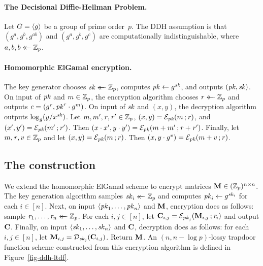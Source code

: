 \paragraph{The Decisional Diffie-Hellman Problem.}
Let $G = \langle g \rangle$ be a group of prime order~$p$. The DDH assumption is
that $(g^a, g^b, g^{ab})$ and $(g^a, g^b, g^c)$ are computationally
indistinguishable, where $a,b,b \mathrel{\leftarrow\mkern-14mu\leftarrow} \mathbb{Z}_p$.

\paragraph{Homomorphic ElGamal encryption.}
The key generator chooses $\mathit{sk} \mathrel{\leftarrow\mkern-14mu\leftarrow} \mathbb{Z}_p$, computes $\mathit{pk} \gets g^{\mathit{sk}}$, and
outputs $(\mathit{pk},\mathit{sk})$.
%
On input of $\mathit{pk}$ and $m \in \mathbb{Z}_p$, the encryption algorithm chooses $\mathit{r}
\mathrel{\leftarrow\mkern-14mu\leftarrow} \mathbb{Z}_p$ and outputs $\mathit{c} = (g^{\mathit{r}}, \mathit{pk}^{\mathit{r}} \cdot g^m)$.
%
On input of $\mathit{sk}$ and $(x, y)$, the decryption algorithm outputs
$\log_g(y/x^{\mathit{sk}})$.
%
Let $m, m^\prime, \mathit{r}, \mathit{r}^\prime \in \mathbb{Z}_p$,
$(x,y) = \mathcal{E}_{\mathit{pk}}(m \,;\mathit{r})$, and $(x^\prime,y^\prime) =
\mathcal{E}_{\mathit{pk}}(m^\prime \,;\mathit{r}^\prime)$. Then $(x\cdot x^\prime, y \cdot
y^\prime) = \mathcal{E}_{\mathit{pk}}(m + m^\prime \,; \mathit{r}+\mathit{r}^\prime)$.
%
Finally, let $m, \mathit{r}, v \in \mathbb{Z}_p$ and let $(x,y) = \mathcal{E}_{\mathit{pk}}(m \,;
\mathit{r})$. Then $(x, y\cdot g^v) = \mathcal{E}_{\mathit{pk}}(m + v \,;\mathit{r})$.

\subsection{The construction}
We extend the homomorphic ElGamal scheme to encrypt matrices $\mathbf{M} \in
(\mathbb{Z}_p)^{n\times n}$.
%
The key generation algorithm samples $\mathit{sk}_i \mathrel{\leftarrow\mkern-14mu\leftarrow} \mathbb{Z}_p$ and computes $\mathit{pk}_i
\gets g^{\mathit{sk}_i}$ for each $i \in [n]$.
%
Next, on input $\langle \mathit{pk}_1, \ldots, \mathit{pk}_n \rangle$ and $\mathbf{M}$, encryption does as
follows: sample $\mathit{r}_1, \ldots, \mathit{r}_n \mathrel{\leftarrow\mkern-14mu\leftarrow} \mathbb{Z}_p$. For each $i,j \in
[n]$, let $\mathbf{C}_{i,j} = \mathcal{E}_{\mathit{pk}_j}(\mathbf{M}_{i,j} \,; \mathit{r}_i)$ and output
$\mathbf{C}$.
%
Finally, on input $\langle \mathit{sk}_1, \ldots, \mathit{sk}_n \rangle$ and $\mathbf{C}$, decryption does as
follows: for each $i,j \in [n]$, let $\mathbf{M}_{i,j} = \mathcal{D}_{\mathit{sk}_j}(\mathbf{C}_{i,j})$.
Return $\mathbf{M}$.
%
An $(n, n-\log p)$-lossy trapdoor function scheme constructed from this
encryption algorithm is defined in Figure~\ref{fig-ddh-ltdf}.

